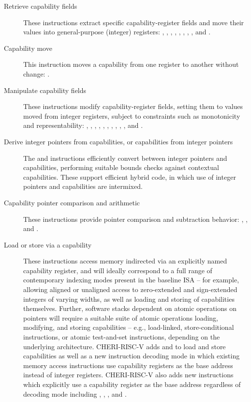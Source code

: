 \begin{description}
\item[Retrieve capability fields]
These instructions extract specific capability-register fields and move their
values into general-purpose (integer) registers:
,
, , ,
, , ,
, and .

\item[Capability move]
This instruction moves a capability from one register to another without
change: .

\item[Manipulate capability fields]
These instructions modify capability-register fields, setting them to values
moved from integer registers, subject to constraints such as monotonicity and
representability: , ,
,
, ,
, ,
, ,
, and
.

\item[Derive integer pointers from capabilities, or capabilities from integer
pointers]
The  and  instructions efficiently
convert between integer pointers and capabilities, performing suitable bounds
checks against contextual capabilities.
These support efficient hybrid code, in which use of integer pointers and
capabilities are intermixed.

\item[Capability pointer comparison and arithmetic]
These instructions provide pointer comparison and
subtraction behavior: , , and
.

\item[Load or store via a capability]
These instructions access memory indirected via an explicitly named capability
register, and will ideally correspond to a full range of contemporary
indexing modes present in the baseline ISA -- for example, allowing aligned or
unaligned access to zero-extended and sign-extended integers of varying
widths, as well as loading and storing of capabilities themselves.
Further, software stacks dependent on atomic operations on pointers will
require a suitable suite of atomic operations loading, modifying, and storing
capabilities -- e.g., load-linked, store-conditional instructions, or atomic
test-and-set instructions, depending on the underlying architecture.
CHERI-RISC-V adds  and  to load and store
capabilities as well as a new instruction decoding mode in which existing
memory access instructions use capability registers as the base
address instead of integer registers.  CHERI-RISC-V also adds new
instructions which explicitly use a capability register as the base
address regardless of decoding mode including
, ,
, and .


\end{description}
